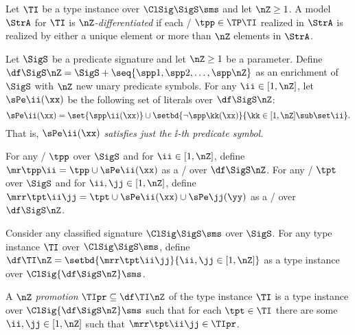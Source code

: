 \begin{definition}
Let $\TI$ be a type instance over $\ClSig\SigS\sms$ and let $\nZ\geq1$.
A model $\StrA$ for $\TI$ is \emph{$\nZ$-differentiated}
if each \onetype/ $\tpp\in\TP\TI$ realized in $\StrA$ is realized by either a
unique element or more than $\nZ$ elements in $\StrA$.
\end{definition}

\begin{definition}
Let $\SigS$ be a predicate signature and let $\nZ\geq1$ be a parameter.
Define $\df\SigS\nZ = \SigS + \seq{\spp1,\spp2,\dots,\spp\nZ}$ as an
enrichment of $\SigS$ with $\nZ$ new unary predicate symbols.
For any $\ii\in[1,\nZ]$, let $\sPe\ii(\xx)$ be the following set of literals
over $\df\SigS\nZ$:
\[
\sPe\ii(\xx) =
\set{\spp\ii(\xx)}\cup\setbd{\lnot\spp\kk(\xx)}{\kk\in[1,\nZ]\sub\set\ii}.
\]
That is, $\sPe\ii(\xx)$ \emph{satisfies just the $\ii$-th predicate symbol}.

For any \onetype/ $\tpp$ over $\SigS$ and for $\ii\in[1,\nZ]$,
define $\mr\tpp\ii = \tpp\cup\sPe\ii(\xx)$ as a \onetype/ over $\df\SigS\nZ$.
For any \twotype/ $\tpt$ over $\SigS$ and for $\ii,\jj\in[1,\nZ]$,
define $\mrr\tpt\ii\jj = \tpt\cup\sPe\ii(\xx)\cup\sPe\jj(\yy)$ as a \twotype/
over $\df\SigS\nZ$.

Consider any classified signature $\ClSig\SigS\sms$ over $\SigS$.
For any type instance $\TI$ over $\ClSig\SigS\sms$,
define $\df\TI\nZ = \setbd{\mrr\tpt\ii\jj}{\ii,\jj\in[1,\nZ]}$ as a type
instance over $\ClSig{\df\SigS\nZ}\sms$.

A \emph{$\nZ$ promotion} $\TIpr\subseteq\df\TI\nZ$ of the type instance $\TI$ is
a type instance over $\ClSig{\df\SigS\nZ}\sms$ such that for each $\tpt\in\TI$
there are some $\ii,\jj\in[1,\nZ]$ such that $\mrr\tpt\ii\jj\in\TIpr$.
\end{definition}

